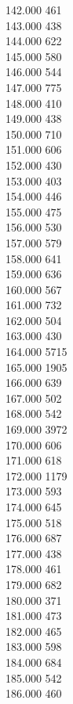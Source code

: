 { 142.000	461 \\
 143.000	438 \\
 144.000	622 \\
 145.000	580 \\
 146.000	544 \\
 147.000	775 \\
 148.000	410 \\
 149.000	438 \\
 150.000	710 \\
 151.000	606 \\
 152.000	430 \\
 153.000	403 \\
 154.000	446 \\
 155.000	475 \\
 156.000	530 \\
 157.000	579 \\
 158.000	641 \\
 159.000	636 \\
 160.000	567 \\
 161.000	732 \\
 162.000	504 \\
 163.000	430 \\
 164.000	5715 \\
 165.000	1905 \\
 166.000	639 \\
 167.000	502 \\
 168.000	542 \\
 169.000	3972 \\
 170.000	606 \\
 171.000	618 \\
 172.000	1179 \\
 173.000	593 \\
 174.000	645 \\
 175.000	518 \\
 176.000	687 \\
 177.000	438 \\
 178.000	461 \\
 179.000	682 \\
 180.000	371 \\
 181.000	473 \\
 182.000	465 \\
 183.000	598 \\
 184.000	684 \\
 185.000	542 \\
 186.000	460 \\
}
